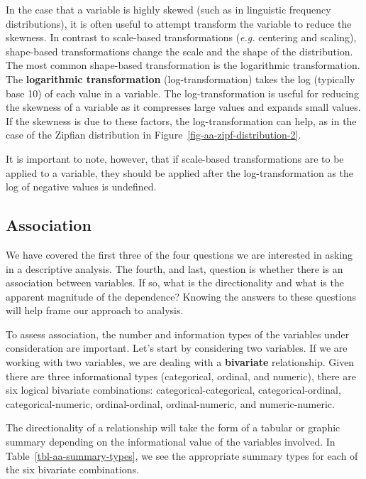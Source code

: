 \documentclass[
  letterpaper,
]{latex/krantz}
\theoremstyle{definition}
\theoremstyle{remark}
\begin{document}
In the case that a variable is highly skewed (such as in linguistic
frequency distributions), it is often useful to attempt transform the
variable to reduce the skewness. In contrast to scale-based
transformations (\emph{e.g.} centering and scaling), shape-based
transformations change the scale and the shape of the distribution. The
most common shape-based transformation is the logarithmic
transformation. The \textbf{logarithmic transformation}
(log-transformation) takes the log (typically base 10) of each value in
a variable. The log-transformation is useful for reducing the skewness
of a variable as it compresses large values and expands small values. If
the skewness is due to these factors, the log-transformation can help,
as in the case of the Zipfian distribution in
Figure~\ref{fig-aa-zipf-distribution-2}.

It is important to note, however, that if scale-based transformations
are to be applied to a variable, they should be applied after the
log-transformation as the log of negative values is undefined.

\subsection{Association}\label{association}

We have covered the first three of the four questions we are interested
in asking in a descriptive analysis. The fourth, and last, question is
whether there is an association between variables. If so, what is the
directionality and what is the apparent magnitude of the dependence?
Knowing the answers to these questions will help frame our approach to
analysis.

To assess association, the number and information types of the variables
under consideration are important. Let's start by considering two
variables. If we are working with two variables, we are dealing with a
\textbf{bivariate} relationship. Given there are three informational
types (categorical, ordinal, and numeric), there are six logical
bivariate combinations: categorical-categorical, categorical-ordinal,
categorical-numeric, ordinal-ordinal, ordinal-numeric, and
numeric-numeric.

The directionality of a relationship will take the form of a tabular or
graphic summary depending on the informational value of the variables
involved. In Table~\ref{tbl-aa-summary-types}, we see the appropriate
summary types for each of the six bivariate combinations.
\end{document}
